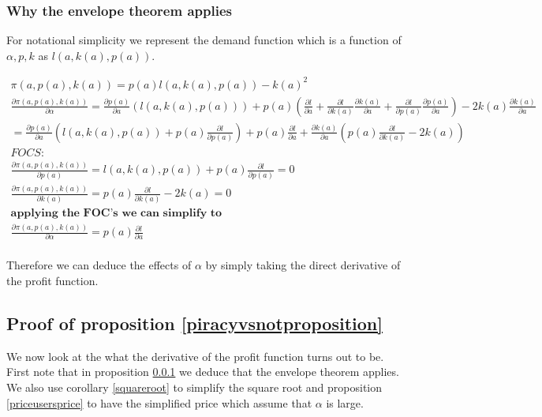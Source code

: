 \documentclass[11pt]{article}
\begin{document}
\subsubsection{Why the envelope theorem applies}

\label{envelopetheorem}

For notational simplicity we represent the demand function which is a function of $\alpha, p, k$ as $l(a, k(a),p(a))$.  

\begin{align*}
\pi(a, p(a),k(a))= p(a) l(a, k(a),p(a))-k(a)^2 \\
\frac{ \partial \pi(a, p(a),k(a))}{\partial \alpha}= \frac{\partial p(a) }{\partial a } \left(
l(a, k(a),p(a)) \right)
+ p(a)\left( \frac{\partial l}{\partial a}
+\frac{\partial l}{\partial k(a)}\frac{\partial k(a)}{\partial a}
+\frac{\partial l}{\partial p(a)}\frac{\partial p(a)}{\partial a}
\right)
- 2 k(a) \frac{\partial k(a)}{\partial a}
\\ 
= \frac{\partial p(a) }{\partial a } \left(
l(a, k(a),p(a)) +p(a) \frac{\partial l}{\partial p(a)} \right)
+ p(a) \frac{\partial l}{\partial a}
+\frac{\partial k(a)}{\partial a}\left( p(a)\frac{\partial l}{\partial k(a)}-2 k(a)
 \right) \\
FOCS: 
\\
\frac{\partial \pi(a, p(a),k(a))}{\partial p(a)}=l(a, k(a),p(a))+p(a) \frac{\partial l}{\partial p(a)}=0 
\\
\frac{\partial \pi(a, p(a),k(a))}{\partial k(a)}=p(a) \frac{\partial l}{\partial k(a)} -2 k(a)=0
\\
\textbf{applying the FOC's we can simplify to}
\\
\frac{ \partial \pi(a, p(a),k(a))}{\partial \alpha}= 
p(a) \frac{\partial l}{\partial a} \\
\end{align*}

Therefore we can deduce the effects of $\alpha$ by simply taking the direct derivative of the profit function. 


\subsection{Proof of proposition \ref{piracyvsnotproposition}} \label{piracyvsnot}

We now look at the what the derivative of the profit function turns out to be. First note that in proposition \ref{envelopetheorem} we deduce that the envelope theorem applies. We also use corollary \ref{squareroot} to simplify the square root and proposition \ref{priceusersprice} to have the simplified price which assume that $\alpha$ is large. 
\end{document}
